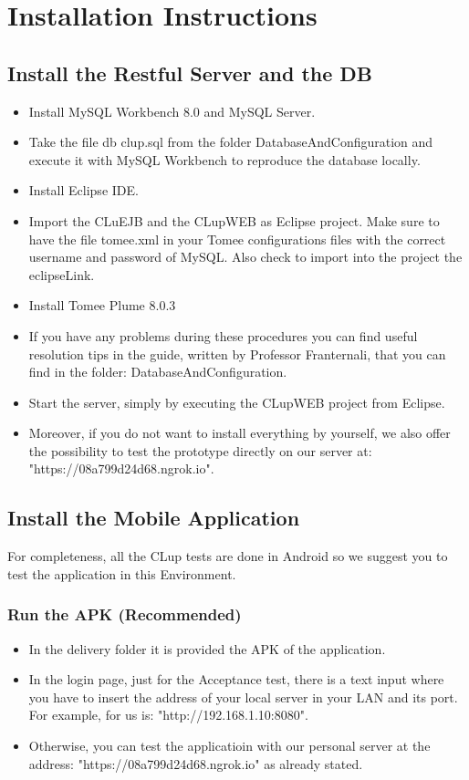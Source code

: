 \chapter{Installation Instructions}

\section{Install the Restful Server and the DB}

\begin{itemize}
\item Install MySQL Workbench 8.0 and MySQL Server.  
\item Take the file db clup.sql from the folder DatabaseAndConfiguration and execute it with MySQL Workbench to reproduce the database locally. 
\item Install Eclipse IDE. 
\item Import the CLuEJB and the CLupWEB as Eclipse project. Make sure to have the file tomee.xml in your Tomee configurations files with the correct username and password of MySQL. Also check to import into the project the eclipseLink.
\item Install Tomee Plume 8.0.3   
\item If you have any problems during these procedures you can find useful resolution tips in the guide, written by Professor Franternali, that you can find in the folder: DatabaseAndConfiguration.  
\item Start the server, simply by executing the CLupWEB project from Eclipse.
\item Moreover, if you do not want to install everything by yourself, we also offer the possibility to test the prototype directly on our server at: \\ "https://08a799d24d68.ngrok.io". 
\end{itemize}

 

\section{Install the Mobile Application}

For completeness, all the CLup tests are done in Android so we suggest you to test the application in this Environment. 

\subsection{Run the APK (Recommended)}
\begin{itemize}
\item In the delivery folder it is provided the APK of the application.
\item In the login page, just for the Acceptance test, there is a text input where you have to insert the address of your local server in your LAN and its port. For example, for us is: "http://192.168.1.10:8080".
\item Otherwise, you can test the applicatioin with our personal server at the address: "https://08a799d24d68.ngrok.io" as already stated.
\end{itemize}

